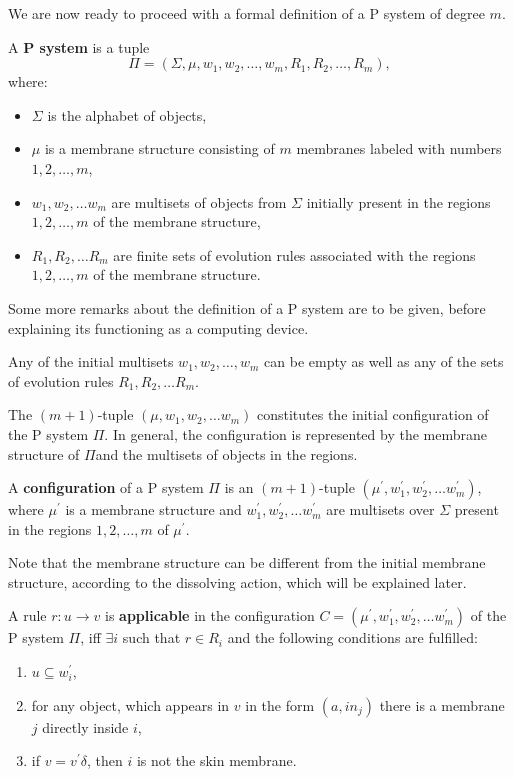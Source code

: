 We are now ready to proceed with a formal definition of a P system of degree $m$.

\begin{definition}
  A  {\bf P system} is a tuple $$\Pi = (\Sigma, \mu, w_1, w_2,\ldots , w_m, R_1, R_2,\ldots , R_m),$$ where:
  \begin{itemize}
    \item $\Sigma$ is the alphabet of objects,
    \item $\mu$ is a membrane structure consisting of $m$ membranes labeled with numbers $1,2,\dots,m$,
    \item $w_1,w_2,\ldots w_m$ are multisets of objects from $\Sigma$ initially present in the regions $1,2,\ldots,m$ of the membrane structure,
    \item $R_1,R_2,\ldots R_m$ are finite sets of evolution rules associated with the regions $1,2,\dots,m$ of the membrane structure.
  \end{itemize}
\end{definition}

Some more remarks about the definition of a P system are to be given, before explaining its functioning as a computing device.

Any of the initial multisets $w_1, w_2,\dots , w_m$ can be empty as well as any of the sets of evolution rules $R_1,R_2,\ldots R_m$.

The $(m+1)$-tuple $(\mu, w_1,w_2,\ldots w_m)$ constitutes the initial configuration of the P system $\Pi$. In general, the configuration is represented by the membrane structure of $\Pi$and the multisets of objects in the regions.

\begin{definition}
  A  {\bf configuration} of a P system $\Pi$ is an $(m+1)$-tuple $(\mu^\prime, w^\prime_1,w^\prime_2,\ldots w^\prime_m)$, where $\mu^\prime$ is a membrane structure and $w^\prime_1,w^\prime_2,\ldots w^\prime_m$ are multisets over $\Sigma$ present in the regions $1,2,\ldots,m$ of $\mu^\prime$.
\end{definition}

Note that the membrane structure can be different from the initial membrane structure, according to the dissolving action, which will be explained later.

\begin{definition}
  A rule $r: u\rightarrow v$ is {\bf applicable} in the configuration $C = (\mu^\prime, w^\prime_1,w^\prime_2,\ldots w^\prime_m)$ of the P system $\Pi$, iff $\exists i$ such that $r\in R_i$ and the following conditions are fulfilled:
  \begin{enumerate}
    \item $u\subseteq w^\prime_i$,
    \item for any object, which appears in $v$ in the form $(a, in_j)$ there is a membrane $j$ directly inside $i$,
    \item if $v=v^\prime\delta$, then $i$ is not the skin membrane.
  \end{enumerate}
\end{definition}

